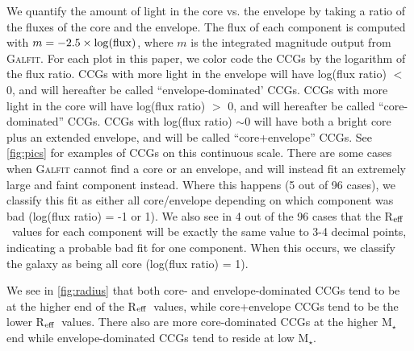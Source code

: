 \documentclass[iop,apj]{emulateapj}
\newcommand{\Reff}{R$_{\rm eff}$}
\begin{document}
We quantify the amount of light in the core vs. the envelope by taking a ratio of the fluxes of the core and the envelope. The flux of each component is computed with $m = -2.5 \times \log({\rm flux})$, where $m$ is the integrated magnitude output from \textsc{Galfit}. For each plot in this paper, we color code the CCGs by the logarithm of the flux ratio. CCGs with more light in the envelope will have log(flux ratio) $<$ 0, and will hereafter be called ``envelope-dominated' CCGs. CCGs with more light in the core will have log(flux ratio) $>$ 0, and will hereafter be called ``core-dominated'' CCGs. CCGs with log(flux ratio) $\sim 0$ will have both a bright core plus an extended envelope, and will be called ``core+envelope'' CCGs. See \autoref{fig:pics} for examples of CCGs on this continuous scale. There are some cases when \textsc{Galfit} cannot find a core or an envelope, and will instead fit an extremely large and faint component instead. Where this happens (5 out of 96 cases), we classify this fit as either all core/envelope depending on which component was bad (log(flux ratio) = -1 or 1). We also see in 4 out of the 96 cases that the \Reff\ values for each component will be exactly the same value to 3-4 decimal points, indicating a probable bad fit for one component. When this occurs, we classify the galaxy as being all core (log(flux ratio) = 1).

We see in \autoref{fig:radius} that both core- and envelope-dominated CCGs tend to be at the higher end of the \Reff\ values, while core+envelope CCGs tend to be the lower \Reff\ values. There also are more core-dominated CCGs at the higher M$_{\star}$ end while envelope-dominated CCGs tend to reside at low M$_{\star}$.
\end{document}
